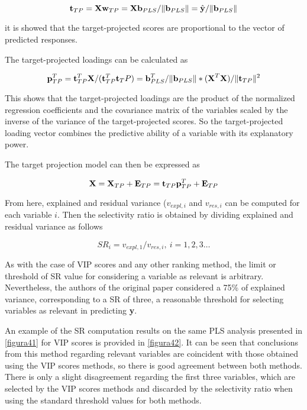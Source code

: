 \begin{equation}
\textbf{\text{t}}_{TP}=\textbf{\text{Xw}}_{TP}=\textbf{\text{Xb}}_{PLS}/\|\textbf{\text{b}}_{PLS}\|=\hat{\textbf{\text{y}}}/\|\textbf{\text{b}}_{PLS}\|
\label{equation31}
\end{equation}

it is showed that the target-projected scores are proportional to the vector of predicted responses.

The target-projected loadings can be calculated as

\begin{equation}
\textbf{\text{p}}^T_{TP}=\textbf{\text{t}}^T_{TP}\textbf{\text{X}}/(\textbf{\text{t}}^T_{TP}\textbf{\text{t}}_TP)=\textbf{\text{b}}^T_{PLS}/\|\textbf{\text{b}}_{PLS}\|*(\textbf{\text{X}}^T\textbf{\text{X}})/\|\textbf{\text{t}}_{TP}\|^2
\label{equation32}
\end{equation}

This shows that the target-projected loadings are the product of the normalized regression coefficients and the covariance matrix of the variables scaled by the inverse of the variance of the target-projected scores. So the target-projected loading vector combines the predictive ability of a variable with its explanatory power.

The target projection model can then be expressed as

\begin{equation}
\textbf{\text{X}}=\textbf{\text{X}}_{TP}+\textbf{\text{E}}_{TP}=\textbf{\text{t}}_{TP}\textbf{\text{p}}^T_{TP}+\textbf{\text{E}}_{TP}
\label{equation33}
\end{equation}

From here, explained and residual variance ($v_{expl,i}$ and $v_{res,i}$ can be computed for each variable $i$. Then the selectivity ratio is obtained by dividing explained and residual variance as follows

\begin{equation}
SR_i=v_{expl,1}/v_{res,i}, \ i=1,2,3 \dots
\label{equation34}
\end{equation}

As with the case of VIP scores and any other ranking method, the limit or threshold of SR value for considering a variable as relevant is arbitrary. Nevertheless, the authors of the original paper considered a 75\% of explained variance, corresponding to a SR of three, a reasonable threshold for selecting variables as relevant in predicting \textbf{y}.

An example of the SR computation results on the same PLS analysis presented in \autoref{figura41} for VIP scores is provided in \autoref{figura42}. It can be seen that conclusions from this method regarding relevant variables are coincident with those obtained using the VIP scores methods, so there is good agreement between both methods. There is only a slight disagreement regarding the first three variables, which are selected by the VIP scores methods and discarded by the selectivity ratio when using the standard threshold values for both methods.


